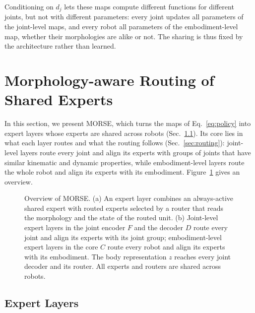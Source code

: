 Conditioning on $d_j$ lets these maps compute different functions for different joints, but not with different
parameters: every joint updates all parameters of the joint-level maps, and every robot all parameters of the
embodiment-level map, whether their
morphologies are alike or not. The sharing is thus fixed by the architecture rather than learned.

\section{Morphology-aware Routing of Shared Experts}
\label{sec:method}

In this section, we present MORSE, which turns the maps of Eq.~\eqref{eq:policy} into expert layers whose experts are
shared across robots (Sec.~\ref{sec:experts}). Its core lies in what each layer routes and what the routing follows
(Sec.~\ref{sec:routing}): joint-level layers route every joint and align its experts with groups of joints that have
similar kinematic and dynamic properties, while embodiment-level layers route the whole robot and align its experts
with its embodiment. Figure~\ref{fig:overview} gives an overview.

\begin{figure}[t]
\centering
\fbox{\rule{0pt}{1.6in}\rule{0.95\textwidth}{0pt}}
\caption{Overview of MORSE. (a) An expert layer combines an always-active shared expert with routed experts selected by
a router that reads the morphology and the state of the routed unit. (b) Joint-level expert layers in the joint
encoder $F$ and the decoder $D$ route every joint and align its experts with its joint group; embodiment-level expert
layers in the core $C$ route every robot and align its experts with its embodiment. The body representation $z$
reaches every joint decoder and its router. All experts and routers are shared across robots.}
\label{fig:overview}
\end{figure}

\subsection{Expert Layers}
\label{sec:experts}

